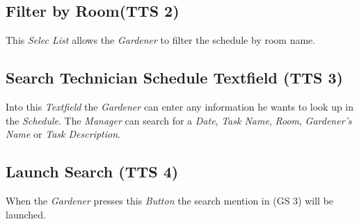 \subsection{Filter by Room(TTS 2)}
This \emph{Selec List} allows the \emph{Gardener} to filter the schedule by room
name.

\subsection{Search Technician Schedule Textfield (TTS 3)}
Into this \emph{Textfield} the \emph{Gardener} can enter any information he
wants to look up in the \emph{Schedule}. The \emph{Manager} can search for
a \emph{Date}, \emph{Task Name}, \emph{Room}, \emph{Gardener's Name} or
\emph{Task Description}.

\subsection{Launch Search (TTS 4)}
When the \emph{Gardener} presses this \emph{Button} the search mention in (GS
3) will be launched.


